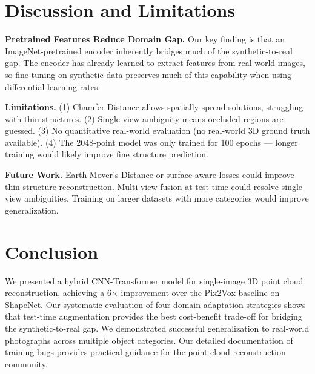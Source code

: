 \documentclass[10pt,twocolumn,letterpaper]{article}
\begin{document}
\section{Discussion and Limitations}

\textbf{Pretrained Features Reduce Domain Gap.}
Our key finding is that an ImageNet-pretrained encoder inherently bridges much of the synthetic-to-real gap.
The encoder has already learned to extract features from real-world images, so fine-tuning on synthetic data preserves much of this capability when using differential learning rates.

\textbf{Limitations.}
(1) Chamfer Distance allows spatially spread solutions, struggling with thin structures.
(2) Single-view ambiguity means occluded regions are guessed.
(3) No quantitative real-world evaluation (no real-world 3D ground truth available).
(4) The 2048-point model was only trained for 100 epochs --- longer training would likely improve fine structure prediction.

\textbf{Future Work.}
Earth Mover's Distance or surface-aware losses could improve thin structure reconstruction.
Multi-view fusion at test time could resolve single-view ambiguities.
Training on larger datasets with more categories would improve generalization.

\section{Conclusion}

We presented a hybrid CNN-Transformer model for single-image 3D point cloud reconstruction, achieving a 6$\times$ improvement over the Pix2Vox baseline on ShapeNet.
Our systematic evaluation of four domain adaptation strategies shows that test-time augmentation provides the best cost-benefit trade-off for bridging the synthetic-to-real gap.
We demonstrated successful generalization to real-world photographs across multiple object categories.
Our detailed documentation of training bugs provides practical guidance for the point cloud reconstruction community.


{\small


}
\end{document}

